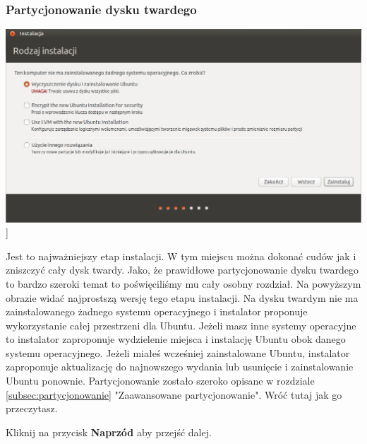 \subsubsection{Partycjonowanie dysku twardego}
\begin{center}
        \includegraphics[scale=0.5]{images/instalator_partycjonowanie_proste.png}]
\end{center}
Jest to najważniejszy etap instalacji. W tym miejscu można dokonać cudów jak i zniszczyć cały dysk twardy. Jako, że prawidłowe partycjonowanie dysku twardego to bardzo szeroki temat to poświęciliśmy mu cały osobny rozdział. Na powyższym obrazie widać najprostszą wersję tego etapu instalacji. Na dysku twardym nie ma zainstalowanego żadnego systemu operacyjnego i instalator proponuje wykorzystanie całej przestrzeni dla Ubuntu. Jeżeli masz inne systemy operacyjne to instalator zaproponuje wydzielenie miejsca i instalację Ubuntu obok danego systemu operacyjnego. Jeżeli miałeś wcześniej zainstalowane Ubuntu, instalator zaproponuje aktualizację do najnowszego wydania lub usunięcie i zainstalowanie Ubuntu ponownie.
Partycjonowanie zostało szeroko opisane w rozdziale \ref{subsec:partycjonowanie} "Zaawansowane partycjonowanie". Wróć tutaj jak go przeczytasz.
\begin{flushright}
Kliknij na przycisk \textbf{Naprzód} aby przejść dalej.
\end{flushright}
\clearpage

